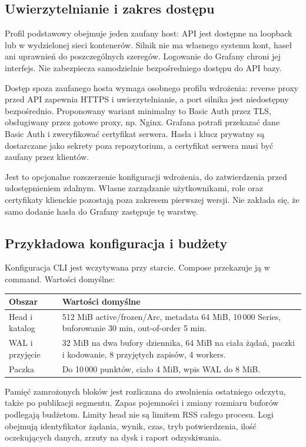 \documentclass[11pt,a4paper]{article}
\begin{document}
\subsection{Uwierzytelnianie i zakres dostępu}
Profil podstawowy obejmuje jeden zaufany host: API jest dostępne na
loopback lub w wydzielonej sieci kontenerów. Silnik nie ma własnego
systemu kont, haseł ani uprawnień do poszczególnych szeregów.
Logowanie do Grafany chroni jej interfejs. Nie zabezpiecza samodzielnie
bezpośredniego dostępu do API bazy.

Dostęp spoza zaufanego hosta wymaga osobnego profilu wdrożenia:
reverse proxy przed API zapewnia HTTPS i uwierzytelnianie, a port silnika
jest niedostępny bezpośrednio. Proponowany wariant minimalny to
Basic Auth przez TLS, obsługiwany przez gotowe proxy, np. Nginx.
Grafana potrafi przekazać dane Basic Auth
i zweryfikować certyfikat serwera.
Hasła i klucz prywatny są dostarczane jako sekrety poza repozytorium,
a certyfikat serwera musi być zaufany przez klientów.

Jest to opcjonalne rozszerzenie konfiguracji wdrożenia, do zatwierdzenia
przed udostępnieniem zdalnym. Własne zarządzanie użytkownikami,
role oraz certyfikaty klienckie pozostają poza zakresem pierwszej wersji.
Nie zakłada się, że samo dodanie hasła do Grafany zastępuje tę warstwę.

\subsection{Przykładowa konfiguracja i budżety}
Konfiguracja CLI jest wczytywana przy starcie. Compose przekazuje ją
w command. Wartości domyślne:
\par
\begin{tabularx}{\linewidth}{P{48mm}Y}
  \toprule
  Obszar          & Wartości domyślne                                   \\ \midrule
  Head i katalog  & 512 MiB active/frozen/Arc, metadata 64 MiB,
  10\,000 Series, buforowanie 30 min, out-of-order 5 min.               \\
  WAL i przyjęcie & 32 MiB na dwa bufory dziennika,
  64 MiB na ciała żądań, paczki i kodowanie,
  8 przyjętych zapisów, 4 workers.                                      \\
  Paczka          & Do 10\,000 punktów, ciało 4 MiB, wpis WAL do 8 MiB. \\
  \bottomrule
\end{tabularx}
\par
Pamięć zamrożonych bloków jest rozliczana do zwolnienia ostatniego
odczytu, także po publikacji segmentu. Zapas pojemności i zmiany
rozmiaru buforów podlegają budżetom.
Limity head nie są limitem RSS całego procesu.
Logi obejmują identyfikator żądania, wynik, czas, tryb potwierdzenia,
ilość oczekujących danych, zrzuty na dysk i raport odzyskiwania.
\end{document}

